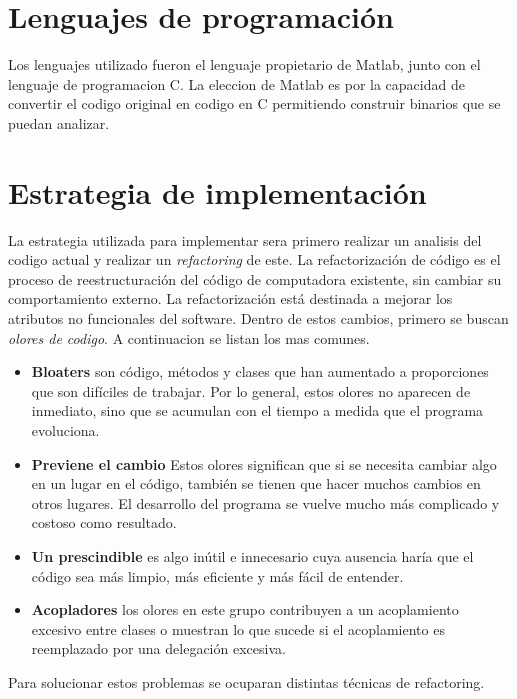 \section{Lenguajes de programación}
Los lenguajes utilizado fueron el lenguaje propietario de Matlab, junto con el lenguaje de programacion C. La eleccion de Matlab es por la capacidad de convertir el codigo original en codigo en C permitiendo construir binarios que se puedan analizar.  

 

\section{Estrategia de implementación}
La estrategia utilizada para implementar sera primero realizar un analisis del codigo actual y realizar un \textit{refactoring} de este. La refactorización de código es el proceso de reestructuración del código de computadora existente, sin cambiar su comportamiento externo. La refactorización está destinada a mejorar los atributos no funcionales del software. Dentro de estos cambios, primero se buscan \textit{olores de codigo}. A continuacion se listan los mas comunes.
 \begin{itemize}
 	\item \textbf{Bloaters} son código, métodos y clases que han aumentado a proporciones  que son difíciles de trabajar. Por lo general, estos olores no aparecen de inmediato, sino que se acumulan con el tiempo a medida que el programa evoluciona.
 	\item \textbf{Previene el cambio} Estos olores significan que si se necesita cambiar algo en un lugar en el código, también se tienen que hacer muchos cambios en otros lugares. El desarrollo del programa se vuelve mucho más complicado y costoso como resultado.
 	\item  \textbf{Un prescindible } es algo inútil e innecesario cuya ausencia haría que el código sea más limpio, más eficiente y más fácil de entender.
 	\item \textbf{Acopladores} los olores en este grupo contribuyen a un acoplamiento excesivo entre clases o muestran lo que sucede si el acoplamiento es reemplazado por una delegación excesiva.
 \end{itemize}

Para solucionar estos problemas se ocuparan distintas técnicas de refactoring.

